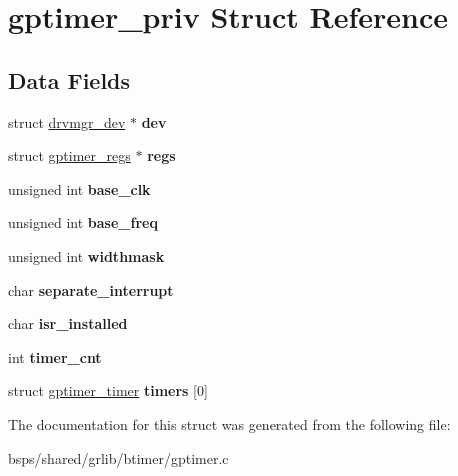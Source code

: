 \hypertarget{structgptimer__priv}{}\section{gptimer\+\_\+priv Struct Reference}
\label{structgptimer__priv}
\subsection*{Data Fields}
\begin{DoxyCompactItemize}
\item 
\mbox{\label{structgptimer__priv_a51eb350888c979744c93d84a6f7c09fd}} 
struct \mbox{\hyperlink{structdrvmgr__dev}{drvmgr\+\_\+dev}} $\ast$ {\bfseries dev}
\item 
\mbox{\label{structgptimer__priv_a3fe4cc91dfbdeccf6f5b121b0c6c14c0}} 
struct \mbox{\hyperlink{structgptimer__regs}{gptimer\+\_\+regs}} $\ast$ {\bfseries regs}
\item 
\mbox{\label{structgptimer__priv_ac5ea5da2ded09541527c580630e8496c}} 
unsigned int {\bfseries base\+\_\+clk}
\item 
\mbox{\label{structgptimer__priv_a39fccd557bcf56f795ff40c02cca5f71}} 
unsigned int {\bfseries base\+\_\+freq}
\item 
\mbox{\label{structgptimer__priv_a39a0da135b0b411aa96c5b0c9c6cb257}} 
unsigned int {\bfseries widthmask}
\item 
\mbox{\label{structgptimer__priv_a87c64930d5e9d609aaa3ce735269ac8a}} 
char {\bfseries separate\+\_\+interrupt}
\item 
\mbox{\label{structgptimer__priv_a64a02b7fb6975d20609a9e68849d97f7}} 
char {\bfseries isr\+\_\+installed}
\item 
\mbox{\label{structgptimer__priv_a6f4241526655f35fb8f9f9b5bcf737f4}} 
int {\bfseries timer\+\_\+cnt}
\item 
\mbox{\label{structgptimer__priv_a9a48e06e4c2e97cd1e92235fc92c04a5}} 
struct \mbox{\hyperlink{structgptimer__timer}{gptimer\+\_\+timer}} {\bfseries timers} \mbox{[}0\mbox{]}
\end{DoxyCompactItemize}


The documentation for this struct was generated from the following file\+:\begin{DoxyCompactItemize}
\item 
bsps/shared/grlib/btimer/gptimer.\+c\end{DoxyCompactItemize}

